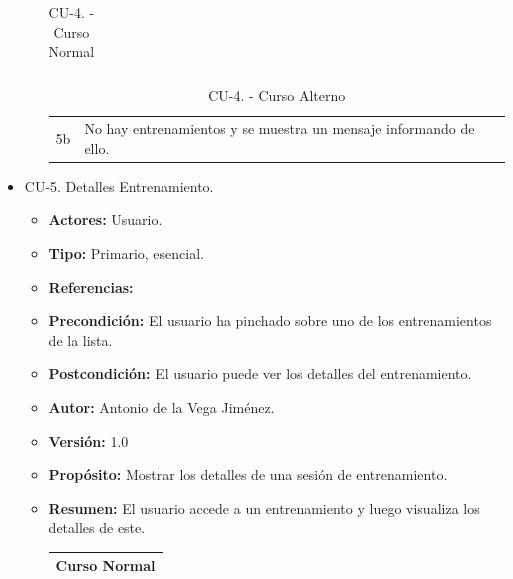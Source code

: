 \begin{itemize}
\begin{itemize}
\begin{table}[H]
\begin{tabularx}{\textwidth}{|l|X|l|X|}
      \end{tabularx}
      \caption{CU-4. - Curso Normal}
      \label{table-6}
    \end{table}
    \begin{table}[H]
      \centering
      \begin{tabularx}{\textwidth}{|l|X|}
       \hline
       \rowcolor[HTML]{C0C0C0} 
       \multicolumn{2}{|l|}{\cellcolor[HTML]{C0C0C0}Curso Alterno} \\ \hline
       \rowcolor[HTML]{FFFFFF} 
              5b                      & No hay entrenamientos y se muestra un mensaje informando de ello.                           \\ \hline
      \end{tabularx}
      \caption{CU-4. - Curso Alterno}
      \label{table-7}
    \end{table}
  \end{itemize}
  \item CU-5. Detalles Entrenamiento.
  \begin{itemize}
    \item \textbf{Actores:} Usuario.
    \item \textbf{Tipo:} Primario, esencial.
    \item \textbf{Referencias:}
    \item \textbf{Precondición:} El usuario ha pinchado sobre uno de los entrenamientos de la lista.
    \item \textbf{Postcondición:} El usuario puede ver los detalles del entrenamiento.
    \item \textbf{Autor:} Antonio de la Vega Jiménez.
    \item \textbf{Versión:} 1.0
    \item \textbf{Propósito:} Mostrar los detalles de una sesión de entrenamiento.
    \item \textbf{Resumen:} El usuario accede a un entrenamiento y luego visualiza los detalles de este.
    \begin{table}[H]
      \centering
      \begin{tabularx}{\textwidth}{|l|X|l|X|}
        \hline
        \multicolumn{4}{|c|}{\cellcolor[HTML]{C0C0C0}Curso Normal}                                                 \\ \hline

\end{tabularx}
\end{table}
\end{itemize}
\end{itemize}

